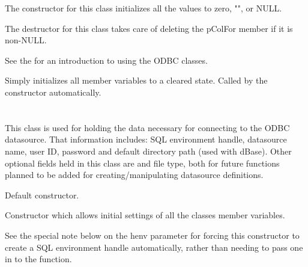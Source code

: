 The constructor for this class initializes all the values to zero, "", or NULL.

The destructor for this class takes care of deleting the pColFor member if
it is non-NULL.

See the  for
an introduction to using the ODBC classes.

\label{wxdbcolinfinitialize}

Simply initializes all member variables to a cleared state.  Called by
the constructor automatically.

\section{}\label{wxdbconnectinf}

This class is used for holding the data necessary for connecting to the ODBC
datasource.  That information includes: SQL environment handle, datasource
name, user ID, password and default directory path (used with dBase).  Other
optional fields held in this class are and file type, both for future
functions planned to be added for creating/manipulating datasource definitions.



Default constructor.


Constructor which allows initial settings of all the classes member variables.

See the special note below on the henv parameter for forcing this constructor
to create a SQL environment handle automatically, rather than needing to pass
one in to the function.


